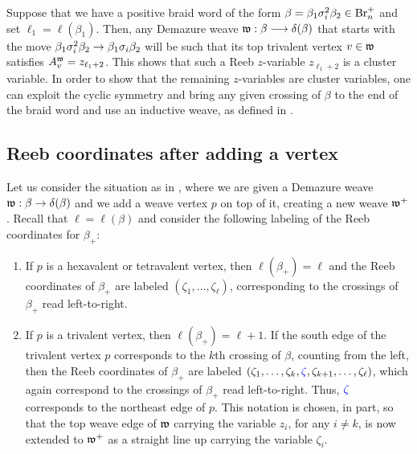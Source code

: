 \begin{example}\label{ex:z_cluster_variables} Suppose that we have a positive braid word of the form $\beta=\beta_1\sigma_i^2\beta_2\in\mbox{Br}_n^+$ and set $\ell_1=\ell(\beta_1)$. Then, any Demazure weave $\mathfrak{w}:\beta\longrightarrow\delta(\beta)$ that starts with the move $\beta_1\sigma_i^2\beta_2\to\beta_1\sigma_i\beta_2$ will be such that its top trivalent vertex $v\in\mathfrak{w}$ satisfies $A_v^{\mathfrak{w}}=z_{\ell_1+2}$. This shows that such a Reeb $z$-variable $z_{\ell_1+2}$ is a cluster variable. In order to show that the remaining $z$-variables are cluster variables, one can exploit the cyclic symmetry and bring any given crossing of $\beta$ to the end of the braid word and use an inductive weave, as defined in \cite[Section 4.3]{CGGLSS25}.\sbs
\end{example}

\subsection{Reeb coordinates after adding a vertex}\label{ssec:Reeb_coordinates_adding_vertex} Let us consider the situation as in , where we are given a Demazure weave $\mathfrak{w}:\beta\to\delta(\beta)$ and we add a weave vertex $p$ on top of it, creating a new weave $\mathfrak{w}^+$. Recall that $\ell=\ell(\beta)$ and consider the following labeling of the Reeb coordinates for $\beta_+$:

\begin{enumerate}
    \item If $p$ is a hexavalent or tetravalent vertex, then $\ell(\beta_+)=\ell$ and the Reeb coordinates of $\beta_+$ are labeled $(\zeta_1,\ldots,\zeta_\ell)$, corresponding to the crossings of $\beta_+$ read left-to-right.\\

    \item If $p$ is a trivalent vertex, then $\ell(\beta_+)=\ell+1$. If the south edge of the trivalent vertex $p$ corresponds to the $k$th crossing of $\beta$, counting from the left, then the Reeb coordinates of $\beta_+$ are labeled $(\zeta_1,\ldots,\zeta_k,\textcolor{blue}{\zeta},\zeta_{k+1},\ldots,\zeta_\ell)$, which again correspond to the crossings of $\beta_+$ read left-to-right. Thus, $\textcolor{blue}{\zeta}$ corresponds to the northeast edge of $p$. This notation is chosen, in part, so that the top weave edge of $\mathfrak{w}$ carrying the variable $z_i$, for any $i\neq k$, is now extended to $\mathfrak{w}^+$ as a straight line up carrying the variable $\zeta_i$.
\end{enumerate}


